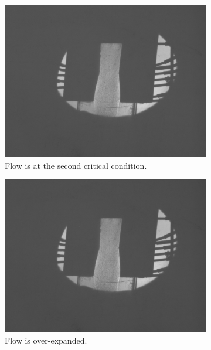\begin{figure}[htpb]
    \begin{subfigure}{0.49\textwidth}
        \centering
        \includegraphics[width=\textwidth]{Figures/4-2nd_critical_condition.tiff}
        \caption{Flow is at the second critical condition.}
        \label{fig:schlieren_second_critical}
    \end{subfigure}
    \begin{subfigure}{0.49\textwidth}
        \centering
        \includegraphics[width=\textwidth]{Figures/3-over-expanded_flow.tiff}
        \caption{Flow is over-expanded.}
        \label{fig:schlieren_over-expanded}
    \end{subfigure} \\
    \begin{subfigure}{0.49\textwidth}

\end{subfigure}
\end{figure}
